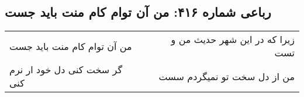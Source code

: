 \begin{center}
\section*{رباعی شماره ۴۱۶: من آن توام کام منت باید جست}
\label{sec:0416}
\begin{longtable}{l p{0.5cm} r}
من آن توام کام منت باید جست
&&
زیرا که در این شهر حدیث من و تست
\\
گر سخت کنی دل خود ار نرم کنی
&&
من از دل سخت تو نمیگردم سست
\\
\end{longtable}
\end{center}
